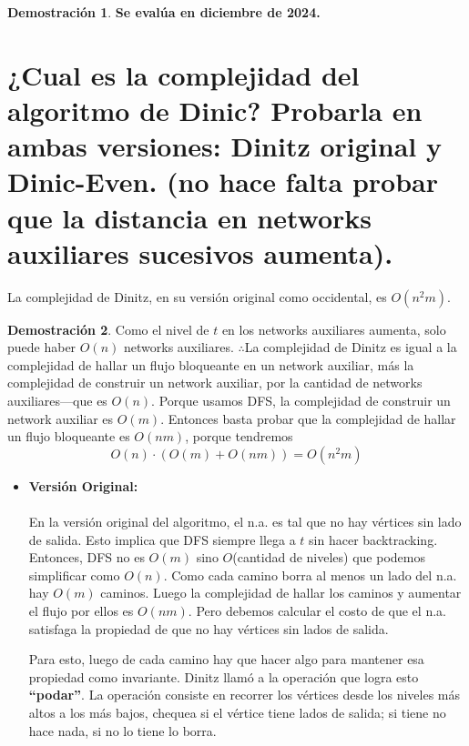 \documentclass[11pt, a4paper]{article}
\theoremstyle{definition}
\newtheorem*{demostracion}{Demostración}
\begin{document}
\begin{demostracion}
    \textbf{Se evalúa en diciembre de 2024.}
\end{demostracion}

\section{¿Cual es la complejidad del algoritmo de Dinic? Probarla en ambas versiones: Dinitz original y Dinic-Even. 
(no hace falta probar que la distancia en networks auxiliares sucesivos aumenta).}
La complejidad de Dinitz, en su versión original como occidental, es $O(n^2m)$.

\begin{demostracion}
    Como el nivel de $t$ en los networks auxiliares aumenta, solo puede haber $O(n)$ networks auxiliares. 
    \(\therefore\)La complejidad de Dinitz es igual a la complejidad de hallar un flujo bloqueante en un network auxiliar, 
    más la complejidad de construir un network auxiliar, 
    por la cantidad de networks auxiliares---que es $O(n)$. 
    Porque usamos DFS, la complejidad de construir un network auxiliar es $O(m)$. 
    Entonces basta probar que la complejidad de hallar un flujo bloqueante es $O(nm)$, porque tendremos
    \[ O(n) \cdot (O(m) + O(nm)) = O(n^2m) \]

    \newpage

    \begin{itemize}
        \item \textbf{Versión Original: } \\ \\
        En la versión original del algoritmo, el n.a. es tal que no hay vértices sin lado de salida. Esto implica que DFS siempre llega a $t$ sin hacer backtracking. Entonces, DFS no es $O(m)$ sino $O$(cantidad de niveles) que podemos simplificar como $O(n)$. Como cada camino borra al menos un lado del n.a. hay $O(m)$ caminos. Luego la complejidad de hallar los caminos y aumentar el flujo por ellos es $O(nm)$. Pero debemos calcular el costo de que el n.a. satisfaga la propiedad de que no hay vértices sin lados de salida.

        Para esto, luego de cada camino hay que hacer algo para mantener esa propiedad como invariante. Dinitz llamó a la operación que logra esto \textbf{``podar''}. La operación consiste en recorrer los vértices desde los niveles más altos a los más bajos, chequea si el vértice tiene lados de salida; si tiene no hace nada, si no lo tiene lo borra.
        

\end{itemize}
\end{demostracion}
\end{document}
